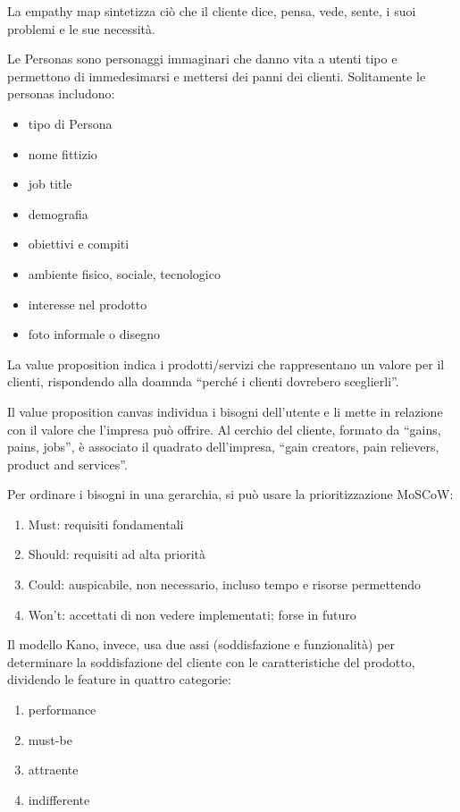 \documentclass[answers, a4paper, 11pt]{exam}
\begin{document}
La empathy map sintetizza ciò che il cliente dice, pensa, vede, sente, i suoi problemi e le sue necessità.

Le Personas sono personaggi immaginari che danno vita a utenti tipo e permettono di immedesimarsi e mettersi dei panni dei clienti. Solitamente le personas includono:
\begin{itemize}
    \item tipo di Persona
    \item nome fittizio
    \item job title
    \item demografia
    \item obiettivi e compiti
    \item ambiente fisico, sociale, tecnologico
    \item interesse nel prodotto
    \item foto informale o disegno
\end{itemize}

La value proposition indica i prodotti/servizi che rappresentano un valore per il clienti, rispondendo alla doamnda ``perché i clienti dovrebero sceglierli''.

Il value proposition canvas individua i bisogni dell'utente e li mette in relazione con il valore che l'impresa può offrire.
Al cerchio del cliente, formato da ``gains, pains, jobs'', è associato il quadrato dell'impresa, ``gain creators, pain relievers, product and services''.

Per ordinare i bisogni in una gerarchia, si può usare la prioritizzazione MoSCoW:

\begin{enumerate}
    \item Must: requisiti fondamentali
    \item Should: requisiti ad alta priorità
    \item Could: auspicabile, non necessario, incluso tempo e risorse permettendo
    \item Won't: accettati di non vedere implementati; forse in futuro
\end{enumerate}

Il modello Kano, invece, usa due assi (soddisfazione e funzionalità) per determinare la soddisfazione del cliente con le caratteristiche del prodotto, dividendo le feature in quattro categorie:

\begin{enumerate}
    \item performance
    \item must-be
    \item attraente
    \item indifferente
\end{enumerate}
\end{document}
